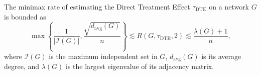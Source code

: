 The minimax rate of estimating the Direct Treatment Effect \(\tau_{\mathrm{DTE}}\) on a network \(G\) is bounded as
\[
\max\left\{\frac{1}{|\mathcal I(G)|},\frac{\sqrt{d_{\mathrm{avg}}(G)}}{n}\right\}
\lesssim R(G,\tau_{\mathrm{DTE}},2)
\lesssim\frac{\lambda(G)+1}{n},
\]
where \(\mathcal I(G)\) is the maximum independent set in \(G\), \(d_{\mathrm{avg}}(G)\) is its average degree, and \(\lambda(G)\) is the largest eigenvalue of its adjacency matrix.